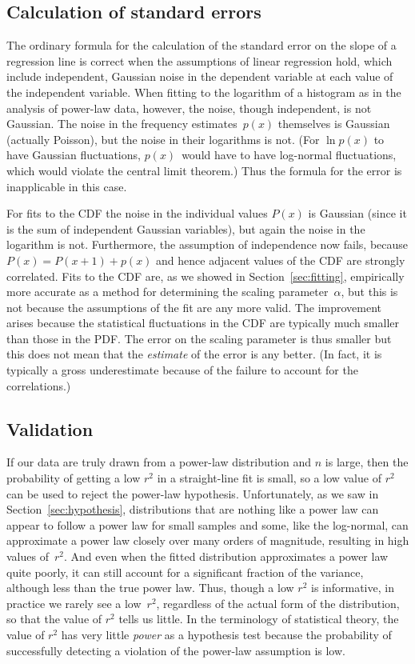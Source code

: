 \documentclass[final]{siamltex}
\newcommand{\defn}{\textit}
\begin{document}
\begin{appendix}
\subsection{Calculation of standard errors}
The ordinary formula for the calculation of the standard error on the slope
of a regression line is correct when the assumptions of linear regression
hold, which include independent, Gaussian noise in the dependent variable
at each value of the independent variable.  When fitting to the logarithm
of a histogram as in the analysis of power-law data, however, the noise,
though independent, is not Gaussian.  The noise in the frequency
estimates~$p(x)$ themselves is Gaussian (actually Poisson), but the noise
in their logarithms is not.  (For $\ln p(x)$ to have Gaussian fluctuations,
$p(x)$~would have to have log-normal fluctuations, which would violate the
central limit theorem.)  Thus the formula for the error is inapplicable in
this case.

For fits to the CDF the noise in the individual values $P(x)$ is Gaussian
(since it is the sum of independent Gaussian variables), but again the
noise in the logarithm is not.  Furthermore, the assumption of independence
now fails, because $P(x)=P(x+1)+p(x)$ and hence adjacent values of the CDF
are strongly correlated.  Fits to the CDF are, as we showed in
Section~\ref{sec:fitting}, empirically more accurate as a method for
determining the scaling parameter~$\alpha$, but this is not because the
assumptions of the fit are any more valid.  The improvement arises because
the statistical fluctuations in the CDF are typically much smaller than
those in the PDF.  The error on the scaling parameter is thus smaller but
this does not mean that the \emph{estimate} of the error is any better.
(In fact, it is typically a gross underestimate because of the failure to
account for the correlations.)


\subsection{Validation}
If our data are truly drawn from a power-law distribution and $n$ is large,
then the probability of getting a low $r^2$ in a straight-line fit is
small, so a low value of $r^2$ can be used to reject the power-law
hypothesis.  Unfortunately, as we saw in Section~\ref{sec:hypothesis},
distributions that are nothing like a power law can appear to follow a
power law for small samples and some, like the log-normal, can approximate
a power law closely over many orders of magnitude, resulting in high values
of~$r^2$.  And even when the fitted distribution approximates a power law
quite poorly, it can still account for a significant fraction of the
variance, although less than the true power law.  Thus, though a low $r^2$
is informative, in practice we rarely see a low~$r^2$, regardless of the
actual form of the distribution, so that the value of $r^2$ tells us
little.  In the terminology of statistical theory, the value of $r^2$ has
very little \defn{power} as a hypothesis test because the probability of
successfully detecting a violation of the power-law assumption is low.



\end{appendix}
\end{document}
